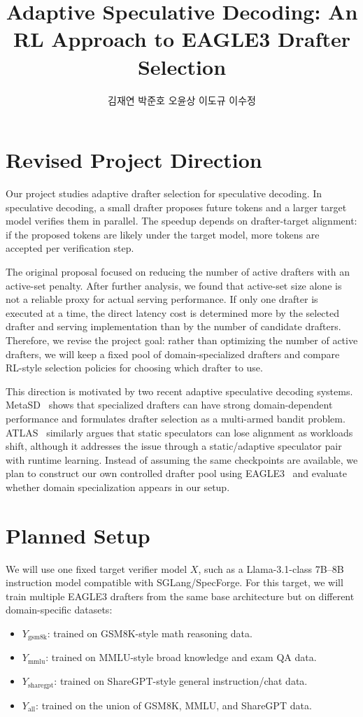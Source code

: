 \documentclass[11pt]{article}
\title{\vspace{-1.8em}Adaptive Speculative Decoding: An RL Approach to EAGLE3 Drafter Selection}
\author{김재연 \quad 박준호 \quad 오윤상 \quad 이도규 \quad 이수정}
\date{}
\begin{document}
\maketitle
\vspace{-1.8em}

\section{Revised Project Direction}

Our project studies adaptive drafter selection for speculative decoding. In speculative decoding, a small drafter proposes future tokens and a larger target model verifies them in parallel. The speedup depends on drafter-target alignment: if the proposed tokens are likely under the target model, more tokens are accepted per verification step.

The original proposal focused on reducing the number of active drafters with an active-set penalty. After further analysis, we found that active-set size alone is not a reliable proxy for actual serving performance. If only one drafter is executed at a time, the direct latency cost is determined more by the selected drafter and serving implementation than by the number of candidate drafters. Therefore, we revise the project goal: rather than optimizing the number of active drafters, we will keep a fixed pool of domain-specialized drafters and compare RL-style selection policies for choosing which drafter to use.

This direction is motivated by two recent adaptive speculative decoding systems. MetaSD~\cite{metasd} shows that specialized drafters can have strong domain-dependent performance and formulates drafter selection as a multi-armed bandit problem. ATLAS~\cite{atlas} similarly argues that static speculators can lose alignment as workloads shift, although it addresses the issue through a static/adaptive speculator pair with runtime learning. Instead of assuming the same checkpoints are available, we plan to construct our own controlled drafter pool using EAGLE3~\cite{eagle3} and evaluate whether domain specialization appears in our setup.

\section{Planned Setup}

We will use one fixed target verifier model $X$, such as a Llama-3.1-class 7B--8B instruction model compatible with SGLang/SpecForge. For this target, we will train multiple EAGLE3 drafters from the same base architecture but on different domain-specific datasets:
\begin{itemize}
    \item $Y_{\mathrm{gsm8k}}$: trained on GSM8K-style math reasoning data.
    \item $Y_{\mathrm{mmlu}}$: trained on MMLU-style broad knowledge and exam QA data.
    \item $Y_{\mathrm{sharegpt}}$: trained on ShareGPT-style general instruction/chat data.
    \item $Y_{\mathrm{all}}$: trained on the union of GSM8K, MMLU, and ShareGPT data.
\end{itemize}
\end{document}

